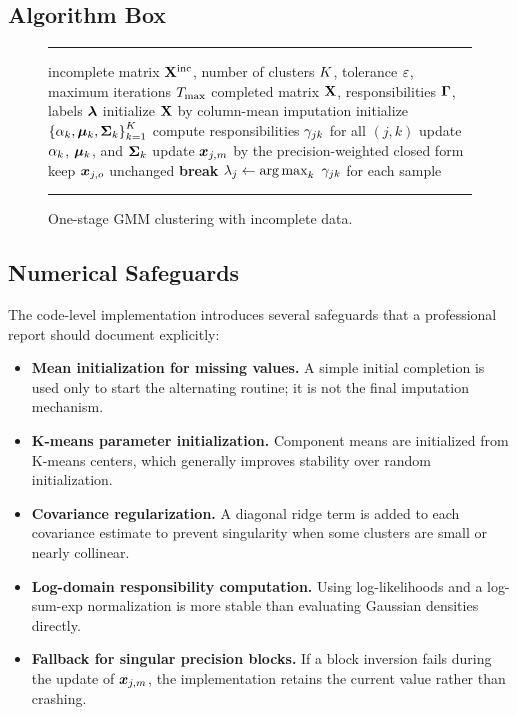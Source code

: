 \subsection{Algorithm Box}
\begin{figure}[t]
\hrule
\vspace{0.5em}
\begin{algorithmic}[1]
\Require incomplete matrix $\mat{X}^{\text{inc}}$, number of clusters $\scal{K}$, tolerance $\scal{\varepsilon}$, maximum iterations $\scal{T}_{\max}$
\Ensure completed matrix $\mat{X}$, responsibilities $\mat{\Gamma}$, labels $\vect{\lambda}$
\State initialize $\mat{X}$ by column-mean imputation
\State initialize $\set*{\scal{\alpha}_k,\vect{\mu}_k,\mat{\Sigma}_k}_{k=1}^{\scal{K}}$
    \State compute responsibilities $\scal{\gamma}_{jk}$ for all $(j,k)$
    \State update $\scal{\alpha}_k$, $\vect{\mu}_k$, and $\mat{\Sigma}_k$
        \State update $\vect{x}_{j,m}$ by the precision-weighted closed form
        \State keep $\vect{x}_{j,o}$ unchanged
    \EndFor
    \State \textbf{break}
    \EndIf
\EndFor
\State $\lambda_j \gets \argmax_k\ \scal{\gamma}_{jk}$ for each sample
\end{algorithmic}
\vspace{0.5em}
\hrule
\caption{One-stage GMM clustering with incomplete data.}
\label{alg:gmm-missing}
\end{figure}

\subsection{Numerical Safeguards}
The code-level implementation introduces several safeguards that a professional report should document explicitly:
\begin{itemize}
    \item \textbf{Mean initialization for missing values.} A simple initial completion is used only to start the alternating routine; it is not the final imputation mechanism.
    \item \textbf{K-means parameter initialization.} Component means are initialized from K-means centers, which generally improves stability over random initialization.
    \item \textbf{Covariance regularization.} A diagonal ridge term is added to each covariance estimate to prevent singularity when some clusters are small or nearly collinear.
    \item \textbf{Log-domain responsibility computation.} Using log-likelihoods and a log-sum-exp normalization is more stable than evaluating Gaussian densities directly.
    \item \textbf{Fallback for singular precision blocks.} If a block inversion fails during the update of $\vect{x}_{j,m}$, the implementation retains the current value rather than crashing.
\end{itemize}

